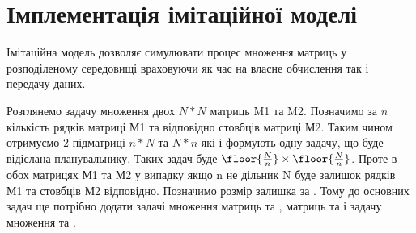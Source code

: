 \section{Імплементація імітаційної моделі}

Імітаційна модель дозволяє симулювати процес множення матриць у розподіленому середовищі враховуючи як час на власне обчислення так і передачу даних.

Розглянемо задачу множення двох $N*N$ матриць M1 та M2. Позначимо за $n$ кількість рядків матриці М1 та відповідно стовбців матриці М2. Таким чином отримуємо 2 підматриці $n*N$ та $N*n$ які і формують одну задачу, що буде відіслана планувальнику. Таких задач буде $ \floor{ \frac{N}{n} } \times \floor{ \frac{N}{n} } $. Проте в обох матрицях М1 та М2 у випадку якщо n не дільник N буде залишок рядків М1 та стовбців М2 відповідно. Позначимо розмір залишка за  . Тому до основних задач ще потрібно додати задачі множення матриць   та  , матриць   та   і задачу множення  та  .